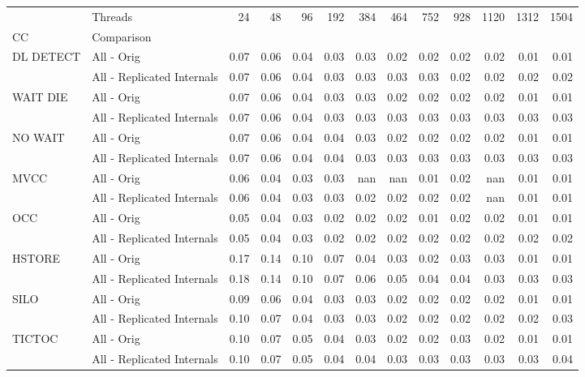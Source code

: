 \begin{tabular}{llrrrrrrrrrrr}
\toprule
       & Threads &  24   &  48   &  96   &  192  &  384  &  464  &  752  &  928  &  1120 &  1312 &  1504 \\
CC & Comparison &       &       &       &       &       &       &       &       &       &       &       \\
\midrule
DL DETECT & All - Orig &  0.07 &  0.06 &  0.04 &  0.03 &  0.03 &  0.02 &  0.02 &  0.02 &  0.02 &  0.01 &  0.01 \\
       & All - Replicated Internals &  0.07 &  0.06 &  0.04 &  0.03 &  0.03 &  0.03 &  0.03 &  0.02 &  0.02 &  0.02 &  0.02 \\
WAIT DIE & All - Orig &  0.07 &  0.06 &  0.04 &  0.03 &  0.03 &  0.02 &  0.02 &  0.02 &  0.02 &  0.01 &  0.01 \\
       & All - Replicated Internals &  0.07 &  0.06 &  0.04 &  0.03 &  0.03 &  0.03 &  0.03 &  0.03 &  0.03 &  0.03 &  0.03 \\
NO WAIT & All - Orig &  0.07 &  0.06 &  0.04 &  0.04 &  0.03 &  0.02 &  0.02 &  0.02 &  0.02 &  0.01 &  0.01 \\
       & All - Replicated Internals &  0.07 &  0.06 &  0.04 &  0.04 &  0.03 &  0.03 &  0.03 &  0.03 &  0.03 &  0.03 &  0.03 \\
MVCC & All - Orig &  0.06 &  0.04 &  0.03 &  0.03 &   nan &   nan &  0.01 &  0.02 &   nan &  0.01 &  0.01 \\
       & All - Replicated Internals &  0.06 &  0.04 &  0.03 &  0.03 &  0.02 &  0.02 &  0.02 &  0.02 &   nan &  0.01 &  0.01 \\
OCC & All - Orig &  0.05 &  0.04 &  0.03 &  0.02 &  0.02 &  0.02 &  0.01 &  0.02 &  0.02 &  0.01 &  0.01 \\
       & All - Replicated Internals &  0.05 &  0.04 &  0.03 &  0.02 &  0.02 &  0.02 &  0.02 &  0.02 &  0.02 &  0.02 &  0.02 \\
HSTORE & All - Orig &  0.17 &  0.14 &  0.10 &  0.07 &  0.04 &  0.03 &  0.02 &  0.03 &  0.03 &  0.01 &  0.01 \\
       & All - Replicated Internals &  0.18 &  0.14 &  0.10 &  0.07 &  0.06 &  0.05 &  0.04 &  0.04 &  0.03 &  0.03 &  0.03 \\
SILO & All - Orig &  0.09 &  0.06 &  0.04 &  0.03 &  0.03 &  0.02 &  0.02 &  0.02 &  0.02 &  0.01 &  0.01 \\
       & All - Replicated Internals &  0.10 &  0.07 &  0.04 &  0.03 &  0.03 &  0.02 &  0.02 &  0.02 &  0.02 &  0.02 &  0.03 \\
TICTOC & All - Orig &  0.10 &  0.07 &  0.05 &  0.04 &  0.03 &  0.02 &  0.02 &  0.03 &  0.02 &  0.01 &  0.01 \\
       & All - Replicated Internals &  0.10 &  0.07 &  0.05 &  0.04 &  0.04 &  0.03 &  0.03 &  0.03 &  0.03 &  0.03 &  0.04 \\
\bottomrule
\end{tabular}
